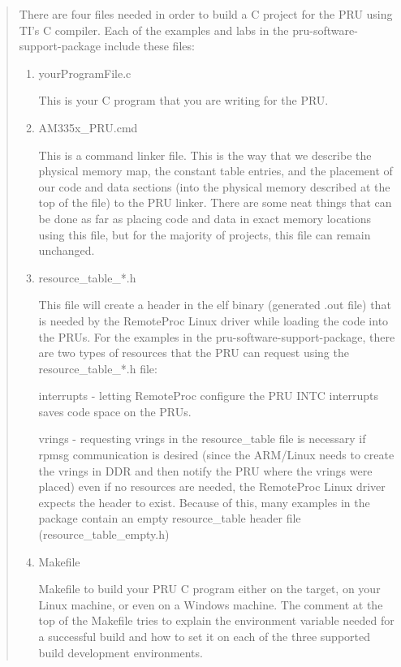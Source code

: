\begin{quotation}
There are four files needed in order to build a C project for the PRU using TI's C compiler. Each of the examples and labs in the pru-software-support-package include these files:
\begin{enumerate}

\item  yourProgramFile.c

This is your C program that you are writing for the PRU.

\item   AM335x\_PRU.cmd

This is a command linker file. This is the way that we describe the physical memory map, the constant table entries, and the placement of our code and data sections (into the physical memory described at the top of the file) to the PRU linker. There are some neat things that can be done as far as placing code and data in exact memory locations using this file, but for the majority of projects, this file can remain unchanged.

\item   resource\_table\_*.h

This file will create a header in the elf binary (generated .out file) that is needed by the RemoteProc Linux driver while loading the code into the PRUs. For the examples in the pru-software-support-package, there are two types of resources that the PRU can request using the resource\_table\_*.h file:

interrupts - letting RemoteProc configure the PRU INTC interrupts saves code space on the PRUs.

vrings - requesting vrings in the resource\_table file is necessary if rpmsg communication is desired (since the ARM/Linux needs to create the vrings in DDR and then notify the PRU where the vrings were placed)
even if no resources are needed, the RemoteProc Linux driver expects the header to exist. Because of this, many examples in the package contain an empty resource\_table header file (resource\_table\_empty.h)

\item   Makefile

Makefile to build your PRU C program either on the target, on your Linux machine, or even on a Windows machine. The comment at the top of the Makefile tries to explain the environment variable needed for a successful build and how to set it on each of the three supported build development environments.

\end{enumerate}
\end{quotation}







